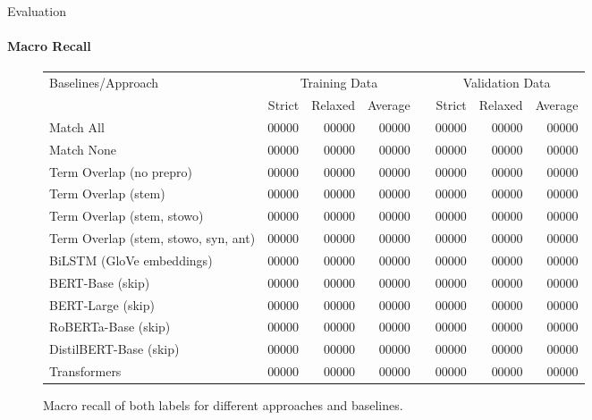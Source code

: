 \documentclass[english,handout]{mlutalk}
\begin{document}
\begin{frame}{Evaluation}
  \framesubtitle{Macro Recall}
  \begin{figure}
    \centering
    \caption{Macro recall of both labels for different approaches and baselines.}
    \tiny
    \begin{tabular}{lrrrlrrr}
      \toprule
      Baselines/Approach & \multicolumn{3}{c}{Training Data} & & \multicolumn{3}{c}{Validation Data}\\ \cline{2-4} \cline{6-8}
        & Strict & Relaxed & Average & & Strict & Relaxed & Average\\
      \midrule
      Match All                           & 00000 & 00000 & 00000 & & 00000 & 00000 & 00000\\
      Match None                          & 00000 & 00000 & 00000 & & 00000 & 00000 & 00000\\
      Term Overlap (no prepro)            & 00000 & 00000 & 00000 & & 00000 & 00000 & 00000\\
      Term Overlap (stem)                 & 00000 & 00000 & 00000 & & 00000 & 00000 & 00000\\
      Term Overlap (stem, stowo)          & 00000 & 00000 & 00000 & & 00000 & 00000 & 00000\\
      Term Overlap (stem, stowo, syn, ant)& 00000 & 00000 & 00000 & & 00000 & 00000 & 00000\\
      \midrule
      BiLSTM (GloVe embeddings)           & 00000 & 00000 & 00000 & & 00000 & 00000 & 00000\\
      BERT-Base (skip)                    & 00000 & 00000 & 00000 & & 00000 & 00000 & 00000\\
      BERT-Large (skip)                   & 00000 & 00000 & 00000 & & 00000 & 00000 & 00000\\
      RoBERTa-Base (skip)                 & 00000 & 00000 & 00000 & & 00000 & 00000 & 00000\\
      DistilBERT-Base (skip)              & 00000 & 00000 & 00000 & & 00000 & 00000 & 00000\\
      Transformers                        & 00000 & 00000 & 00000 & & 00000 & 00000 & 00000\\
      \bottomrule
    \end{tabular}
  \end{figure}
\end{frame}
\end{document}
